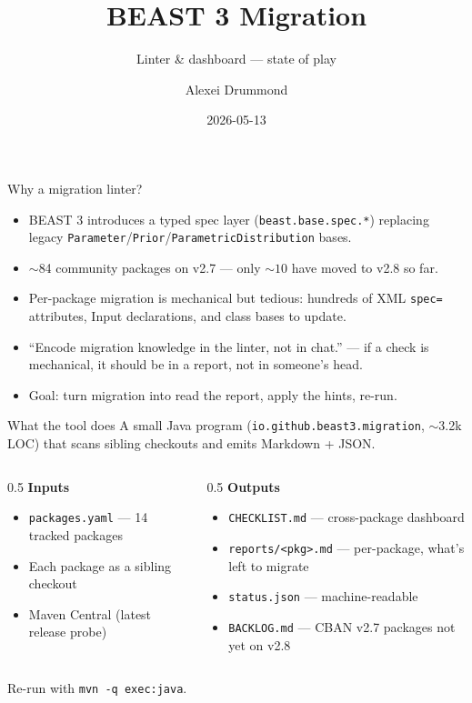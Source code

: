 \documentclass[aspectratio=169]{beamer}
\title{BEAST 3 Migration}
\subtitle{Linter \& dashboard --- state of play}
\author{Alexei Drummond}
\date{2026-05-13}
\begin{document}
\maketitle

\begin{frame}{Why a migration linter?}
  \begin{itemize}
    \item BEAST 3 introduces a \alert{typed spec layer} (\texttt{beast.base.spec.*}) replacing legacy \texttt{Parameter}/\texttt{Prior}/\texttt{ParametricDistribution} bases.
    \item $\sim$84 community packages on v2.7 --- only \alert{$\sim10$} have moved to v2.8 so far.
    \item Per-package migration is mechanical but tedious: hundreds of XML \texttt{spec=} attributes, Input declarations, and class bases to update.
    \item ``Encode migration knowledge in the linter, not in chat.'' --- if a check is mechanical, it should be in a report, not in someone's head.
    \item Goal: turn migration into \alert{read the report, apply the hints, re-run}.
  \end{itemize}
\end{frame}

\begin{frame}{What the tool does}
  A small Java program (\texttt{io.github.beast3.migration}, $\sim$3.2k LOC) that scans sibling checkouts and emits Markdown + JSON.
  \begin{columns}[T]
    \begin{column}{0.5\textwidth}
      \textbf{Inputs}
      \begin{itemize}
        \item \texttt{packages.yaml} --- 14 tracked packages
        \item Each package as a sibling checkout
        \item Maven Central (latest release probe)
      \end{itemize}
    \end{column}
    \begin{column}{0.5\textwidth}
      \textbf{Outputs}
      \begin{itemize}
        \item \texttt{CHECKLIST.md} --- cross-package dashboard
        \item \texttt{reports/<pkg>.md} --- per-package, what's left to migrate
        \item \texttt{status.json} --- machine-readable
        \item \texttt{BACKLOG.md} --- CBAN v2.7 packages not yet on v2.8
      \end{itemize}
    \end{column}
  \end{columns}
  \vspace{0.6em}
  Re-run with \texttt{mvn -q exec:java}.
\end{frame}
\end{document}
